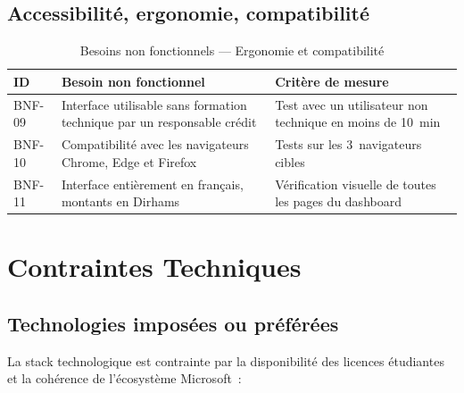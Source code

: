 \documentclass[12pt, a4paper]{report}
\begin{document}
\subsection{Accessibilité, ergonomie, compatibilité}

\begin{table}[H]
\centering
\caption{Besoins non fonctionnels --- Ergonomie et compatibilité}
\label{tab:bnf_ux}
\renewcommand{\arraystretch}{1.4}
\begin{tabularx}{\textwidth}{p{1.5cm} X p{4.5cm}}
\toprule
\rowcolor{primary!12}
ID & Besoin non fonctionnel & Critère de mesure \\
\midrule
BNF-09 & Interface utilisable sans formation technique par un responsable crédit & Test avec un utilisateur non technique en moins de 10~min \\
BNF-10 & Compatibilité avec les navigateurs Chrome, Edge et Firefox & Tests sur les 3~navigateurs cibles \\
BNF-11 & Interface entièrement en français, montants en Dirhams & Vérification visuelle de toutes les pages du dashboard \\
\bottomrule
\end{tabularx}
\end{table}

\section{Contraintes Techniques}

\subsection{Technologies imposées ou préférées}

La stack technologique est contrainte par la disponibilité des licences étudiantes
et la cohérence de l'écosystème Microsoft~:
\end{document}
